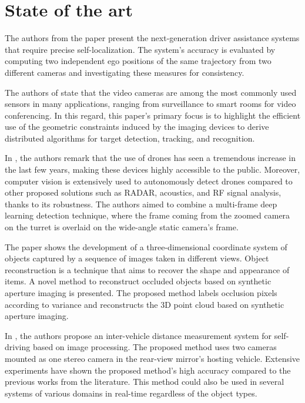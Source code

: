 \chapter{State of the art} \label{capitulo2}

The authors from the paper \cite{Lategahn2013} present the next-generation driver assistance systems that require precise self-localization. The system's accuracy is evaluated by computing two independent ego positions of the same trajectory from two different cameras and investigating these measures for consistency.

The authors of \cite{Sankaranarayanan2008} state that the video cameras are among the most commonly used sensors in many applications, ranging from surveillance to smart rooms for video conferencing. In this regard, this paper's primary focus is to highlight the efficient use of the geometric constraints induced by the imaging devices to derive distributed algorithms for target detection, tracking, and recognition.

In \cite{Unlu2019}, the authors remark that the use of drones has seen a tremendous increase in the last few years, making these devices highly accessible to the public. Moreover, computer vision is extensively used to autonomously detect drones compared to other proposed solutions such as RADAR, acoustics, and RF signal analysis, thanks to its robustness. The authors aimed to combine a multi-frame deep learning detection technique, where the frame coming from the zoomed camera on the turret is overlaid on the wide-angle static camera's frame.

The paper \cite{Pei2019} shows the development of a three-dimensional coordinate system of objects captured by a sequence of images taken in different views. Object reconstruction is a technique that aims to recover the shape and appearance of items. A novel method to reconstruct occluded objects based on synthetic aperture imaging is presented. The proposed method labels occlusion pixels according to variance and reconstructs the 3D point cloud based on synthetic aperture imaging.

In \cite{Zaarane2020}, the authors propose an inter-vehicle distance measurement system for self-driving based on image processing. The proposed method uses two cameras mounted as one stereo camera in the rear-view mirror's hosting vehicle.  Extensive experiments have shown the proposed method's high accuracy compared to the previous works from the literature. This method could also be used in several systems of various domains in real-time regardless of the object types.

